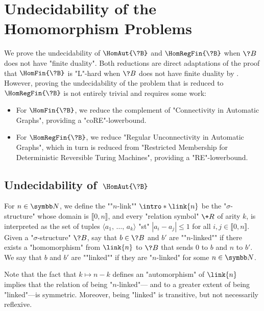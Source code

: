 \section{\AP\label{sec:undecidability}%
	Undecidability of the Homomorphism Problems}


We prove the undecidability of $\HomAut{\?B}$ and $\HomRegFin{\?B}$
when $\?B$ does not have "finite duality". Both reductions are
direct adaptations of the proof that $\HomFin{\?B}$ is "L"-hard when $\?B$ does not
have finite duality by \textcite[Theorem 3.2]{LaroseTesson2009UniversalAlgebraCSP}.
However, proving the undecidability of the problem that is reduced
to $\HomRegFin{\?B}$ is not entirely trivial and requires some work:
\begin{itemize}
	\item For $\HomFin{\?B}$, we reduce the complement of "Connectivity in Automatic Graphs",
		providing a "coRE"-lowerbound.
	\item For $\HomRegFin{\?B}$, we reduce "Regular Unconnectivity in Automatic Graphs",
		which in turn is reduced from "Restricted Membership for Deterministic Reversible Turing Machines", providing a "RE"-lowerbound.
\end{itemize}

\subsection{\AP\label{sec:undecidability-hom}%
	Undecidability of \,$\HomAut{\?B}$}

For $n\in\N$, we define the \AP""$n$-link"" $\intro*\link{n}$ be the "$\sigma$-structure" 
whose domain is $\lBrack 0,n\rBrack$, and every "relation symbol" $\+R$
of arity $k$, is interpreted as the set of tuples $\langle a_1,\, \hdots,\, a_k \rangle$
"st" $|a_i-a_j| \leq 1$ for all $i,j \in \lBrack 0,n \rBrack$.
Given a "$\sigma$-structure" $\?B$, say that $b \in \?B$ and $b'$ are
\AP""$n$-linked"" if there exists a "homomorphism" from $\link{n}$ to $\?B$
that sends $0$ to $b$ and $n$ to $b'$. We say that $b$ and $b'$ are \AP""linked"" if
they are "$n$-linked" for some $n \in \N$.

Note that the fact that $k \mapsto n-k$
defines an "automorphism" of $\link{n}$ implies that the relation of being "$n$-linked"---
and to a greater extent of being "linked"---is symmetric.
Moreover, being "linked" is transitive, but not necessarily reflexive.

